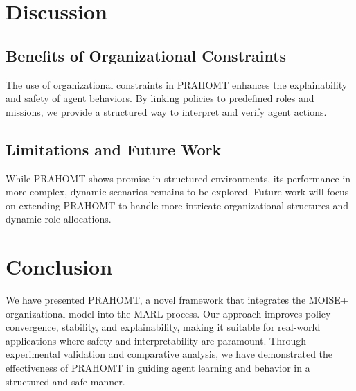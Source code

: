 \documentclass{article}
\begin{document}
\section{Discussion}
\subsection{Benefits of Organizational Constraints}
The use of organizational constraints in PRAHOMT enhances the explainability and safety of agent behaviors. By linking policies to predefined roles and missions, we provide a structured way to interpret and verify agent actions.

\subsection{Limitations and Future Work}
While PRAHOMT shows promise in structured environments, its performance in more complex, dynamic scenarios remains to be explored. Future work will focus on extending PRAHOMT to handle more intricate organizational structures and dynamic role allocations.

\section{Conclusion}
We have presented PRAHOMT, a novel framework that integrates the MOISE+ organizational model into the MARL process. Our approach improves policy convergence, stability, and explainability, making it suitable for real-world applications where safety and interpretability are paramount. Through experimental validation and comparative analysis, we have demonstrated the effectiveness of PRAHOMT in guiding agent learning and behavior in a structured and safe manner.



\end{document}
